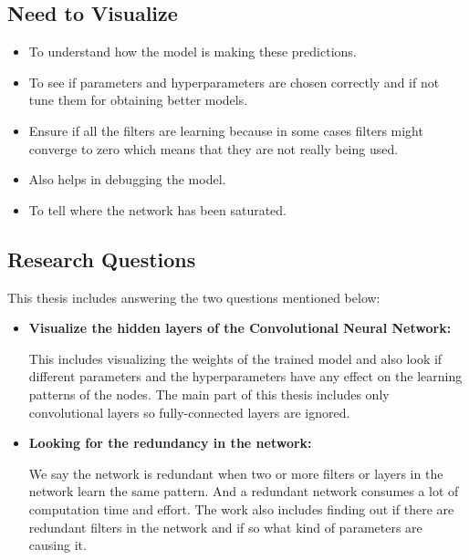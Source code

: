   \subsection{Need to Visualize}
   \begin{itemize}
       \item To understand how the model is making these predictions.
       \item To see if parameters and hyperparameters are chosen correctly and if not tune them for obtaining better models.
       \item Ensure if all the filters are learning because in some cases filters might converge to zero which means that they are not really being used.
       \item Also helps in debugging the model.
       \item To tell where the network has been saturated. 
   \end{itemize}
\newpage   \subsection{Research Questions}
   This thesis includes answering the two questions mentioned below:
\begin{itemize}
    \item \textbf{Visualize the hidden layers of the Convolutional Neural Network:}
    
    This includes visualizing the weights of the trained model and also look if different parameters and the hyperparameters have any effect on the learning patterns of the nodes. The main part of this thesis includes only convolutional layers so fully-connected layers are ignored. 
    \item \textbf{Looking for the redundancy in the network:}
    
  We say the network is redundant when two or more filters or layers in the network learn the same pattern. And a redundant network consumes a lot of computation time and effort. The work also includes finding out if there are redundant filters in the network and if so what kind of parameters are causing it. 
\end{itemize}


    

    
     
     
     

     
     
     
     
     
     
     
 






